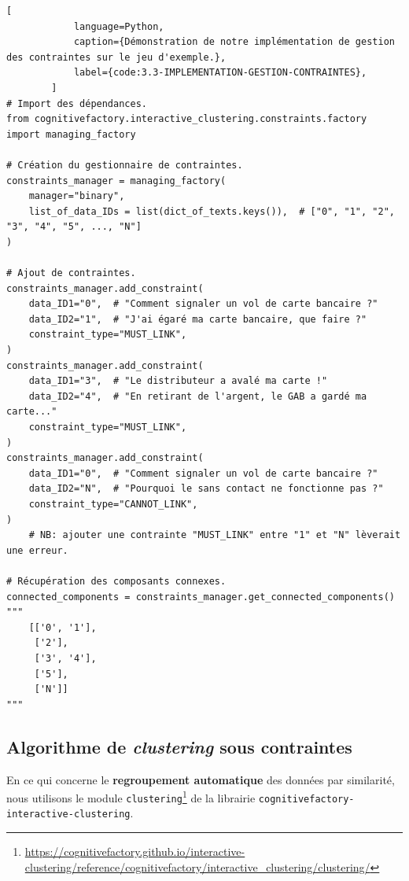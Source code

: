 		\begin{lstlisting}[
			language=Python,
			caption={Démonstration de notre implémentation de gestion des contraintes sur le jeu d'exemple.},
			label={code:3.3-IMPLEMENTATION-GESTION-CONTRAINTES},
		]
# Import des dépendances.
from cognitivefactory.interactive_clustering.constraints.factory import managing_factory

# Création du gestionnaire de contraintes.
constraints_manager = managing_factory(
	manager="binary",
	list_of_data_IDs = list(dict_of_texts.keys()),  # ["0", "1", "2", "3", "4", "5", ..., "N"]
)

# Ajout de contraintes.
constraints_manager.add_constraint(
	data_ID1="0",  # "Comment signaler un vol de carte bancaire ?"
	data_ID2="1",  # "J'ai égaré ma carte bancaire, que faire ?"
	constraint_type="MUST_LINK",
)
constraints_manager.add_constraint(
	data_ID1="3",  # "Le distributeur a avalé ma carte !"
	data_ID2="4",  # "En retirant de l'argent, le GAB a gardé ma carte..."
	constraint_type="MUST_LINK",
)
constraints_manager.add_constraint(
	data_ID1="0",  # "Comment signaler un vol de carte bancaire ?"
	data_ID2="N",  # "Pourquoi le sans contact ne fonctionne pas ?"
	constraint_type="CANNOT_LINK",
)
	# NB: ajouter une contrainte "MUST_LINK" entre "1" et "N" lèverait une erreur.

# Récupération des composants connexes.
connected_components = constraints_manager.get_connected_components()
"""
	[['0', '1'],
	 ['2'],
	 ['3', '4'],
	 ['5'],
	 ['N']]
"""
		\end{lstlisting}
		
		
		\subsection{Algorithme de \textit{clustering} sous contraintes}
		\label{section:3.3.3-ALGORITHMES-CLUSTERING-SOUS-CONTRAINTES}
		
		En ce qui concerne le \textbf{regroupement automatique} des données par similarité, nous utilisons le module \texttt{clustering}\footnote{\url{https://cognitivefactory.github.io/interactive-clustering/reference/cognitivefactory/interactive_clustering/clustering/}} de la librairie \texttt{cognitivefactory-interactive-clustering}.
		
